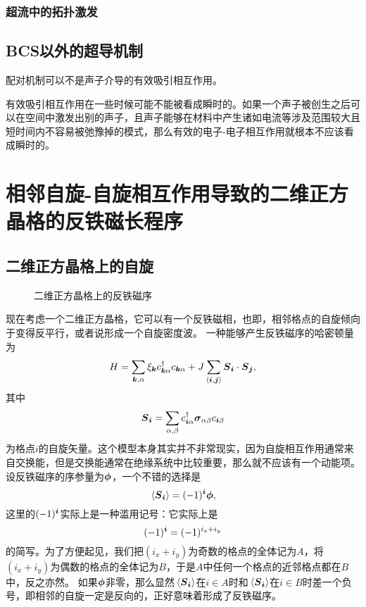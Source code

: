 \subsubsection{超流中的拓扑激发}

\subsection{BCS以外的超导机制}

配对机制可以不是声子介导的有效吸引相互作用。

有效吸引相互作用在一些时候可能不能被看成瞬时的。如果一个声子被创生之后可以在空间中激发出别的声子，且声子能够在材料中产生诸如电流等涉及范围较大且短时间内不容易被弛豫掉的模式，那么有效的电子-电子相互作用就根本不应该看成瞬时的。

\section{相邻自旋-自旋相互作用导致的二维正方晶格的反铁磁长程序}

\subsection{二维正方晶格上的自旋}

\begin{figure}
    \centering
    \subfigure[自旋密度波]{
              
    }
    \subfigure[SDW形成后的两条子格子]{
        
    }
    \caption{二维正方晶格上的反铁磁序}
\end{figure}

现在考虑一个二维正方晶格，它可以有一个反铁磁相，也即，相邻格点的自旋倾向于变得反平行，或者说形成一个自旋密度波。
一种能够产生反铁磁序的哈密顿量为
\begin{equation}
    {H} = \sum_{\vb*{k}, \alpha} \xi_{\vb*{k}} {c}_{\vb*{k} \alpha}^\dagger {c}_{\vb*{k} \alpha} + J \sum_{\langle \vb*{i}, \vb*{j} \rangle} {\vb*{S}}_{\vb*{i}} \cdot {\vb*{S}}_{\vb*{j}},
    \label{eq:2dim-square-spin}
\end{equation}
其中
\begin{equation}
    {\vb*{S}}_{\vb*{i}} = \sum_{\alpha, \beta} {c}^\dagger_{\vb*{i} \alpha} \vb*{\sigma}_{\alpha \beta} {c}_{\vb*{i} \beta}
    \label{eq:spin-wave-order-parameter}
\end{equation}
为格点$i$的自旋矢量。这个模型本身其实并不非常现实，因为自旋相互作用通常来自交换能，但是交换能通常在绝缘系统中比较重要，那么就不应该有一个动能项。
设反铁磁序的序参量为$\vb*{\phi}$，一个不错的选择是
\begin{equation}
    \expval*{{\vb*{S}}_{\vb*{i}}} = (-1)^{\vb*{i}} \vb*{\phi},
\end{equation}
这里的$(-1)^{\vb*{i}}$实际上是一种滥用记号：它实际上是
\[
    (-1)^{\vb*{i}} = (-1)^{i_x + i_y}
\]
的简写。为了方便起见，我们把$(i_x + i_y)$为奇数的格点的全体记为$A$，将$(i_x + i_y)$为偶数的格点的全体记为$B$，于是$A$中任何一个格点的近邻格点都在$B$中，反之亦然。
如果$\vb*{\phi}$非零，那么显然$\expval*{{\vb*{S}}_{\vb*{i}}}$在$i \in A$时和$\expval*{{\vb*{S}}_{\vb*{i}}}$在$i \in B$时差一个负号，即相邻的自旋一定是反向的，正好意味着形成了反铁磁序。


